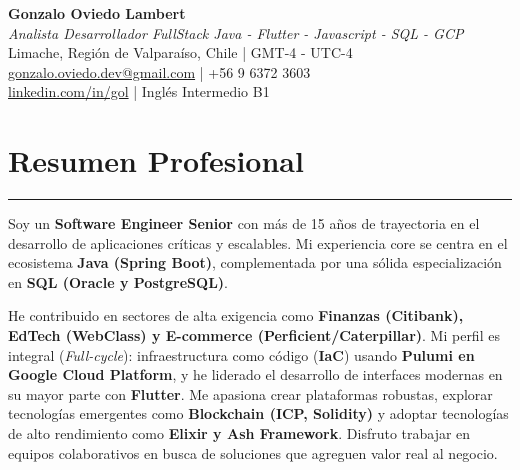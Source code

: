 \documentclass[11pt,a4paper]{article}
\begin{document}
\begin{center}
    {\LARGE \textbf{Gonzalo Oviedo Lambert}} \\
    \vspace{2pt}
    \textit{Analista Desarrollador FullStack Java - Flutter - Javascript - SQL - GCP} \\
    \vspace{2pt}
    Limache, Región de Valparaíso, Chile | GMT-4 - UTC-4 \\
    \vspace{2pt}
    \href{gonzalo.oviedo.dev@gmail.com}{gonzalo.oviedo.dev@gmail.com} | +56 9 6372 3603 \\
    \href{https://www.linkedin.com/in/gol}{linkedin.com/in/gol} | Inglés Intermedio B1
\end{center}

\section*{Resumen Profesional}
\hrule
\vspace{5pt}
\noindent
Soy un \textbf{Software Engineer Senior} con más de 15 años de trayectoria en el desarrollo de aplicaciones críticas y escalables. Mi experiencia core se centra en el ecosistema \textbf{Java (Spring Boot)}, complementada por una sólida especialización en \textbf{SQL (Oracle y PostgreSQL)}.

\par\vspace{8pt}

\noindent
He contribuido en sectores de alta exigencia como \textbf{Finanzas (Citibank), EdTech (WebClass) y E-commerce (Perficient/Caterpillar)}. Mi perfil es integral (\textit{Full-cycle}): infraestructura como código (\textbf{IaC}) usando \textbf{Pulumi en Google Cloud Platform}, y he liderado el desarrollo de interfaces modernas en su mayor parte con \textbf{Flutter}. Me apasiona crear plataformas robustas, explorar tecnologías emergentes como \textbf{Blockchain (ICP, Solidity)} y adoptar tecnologías de alto rendimiento como \textbf{Elixir y Ash Framework}. Disfruto trabajar en equipos colaborativos en busca de soluciones que agreguen valor real al negocio.
\end{document}
